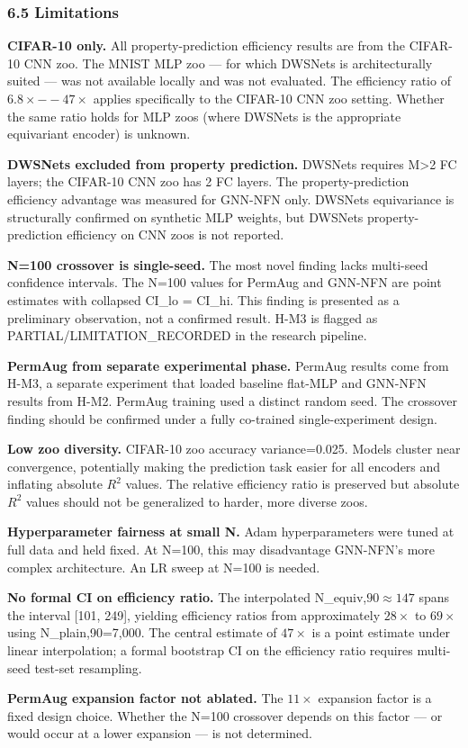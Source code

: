 \subsubsection{6.5 Limitations}

\textbf{CIFAR-10 only.} All property-prediction efficiency results are from the CIFAR-10 CNN zoo. The MNIST MLP zoo --- for which DWSNets is architecturally suited --- was not available locally and was not evaluated. The efficiency ratio of 6.$8\times--47\times$ applies specifically to the CIFAR-10 CNN zoo setting. Whether the same ratio holds for MLP zoos (where DWSNets is the appropriate equivariant encoder) is unknown.

\textbf{DWSNets excluded from property prediction.} DWSNets requires M>2 FC layers; the CIFAR-10 CNN zoo has 2 FC layers. The property-prediction efficiency advantage was measured for GNN-NFN only. DWSNets equivariance is structurally confirmed on synthetic MLP weights, but DWSNets property-prediction efficiency on CNN zoos is not reported.

\textbf{N=100 crossover is single-seed.} The most novel finding lacks multi-seed confidence intervals. The N=100 values for PermAug and GNN-NFN are point estimates with collapsed CI\_lo = CI\_hi. This finding is presented as a preliminary observation, not a confirmed result. H-M3 is flagged as PARTIAL/LIMITATION\_RECORDED in the research pipeline.

\textbf{PermAug from separate experimental phase.} PermAug results come from H-M3, a separate experiment that loaded baseline flat-MLP and GNN-NFN results from H-M2. PermAug training used a distinct random seed. The crossover finding should be confirmed under a fully co-trained single-experiment design.

\textbf{Low zoo diversity.} CIFAR-10 zoo accuracy variance=0.025. Models cluster near convergence, potentially making the prediction task easier for all encoders and inflating absolute $R^2$ values. The relative efficiency ratio is preserved but absolute $R^2$ values should not be generalized to harder, more diverse zoos.

\textbf{Hyperparameter fairness at small N.} Adam hyperparameters were tuned at full data and held fixed. At N=100, this may disadvantage GNN-NFN's more complex architecture. An LR sweep at N=100 is needed.

\textbf{No formal CI on efficiency ratio.} The interpolated N\_equiv,$90\approx 147$ spans the interval [101, 249], yielding efficiency ratios from approximately $28\times$ to $69\times$ using N\_plain,90=7,000. The central estimate of $47\times$ is a point estimate under linear interpolation; a formal bootstrap CI on the efficiency ratio requires multi-seed test-set resampling.

\textbf{PermAug expansion factor not ablated.} The $11\times$ expansion factor is a fixed design choice. Whether the N=100 crossover depends on this factor --- or would occur at a lower expansion --- is not determined.

